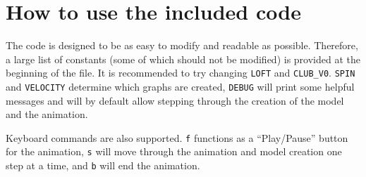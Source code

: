 \documentclass{article}
\begin{document}
\appendix
\section{How to use the included code}
The code is designed to be as easy to modify and readable as possible. Therefore, a large list of constants (some of which should not be modified) is provided at the beginning of the file. It is recommended to try changing \texttt{LOFT} and \texttt{CLUB\_V0}. \texttt{SPIN} and \texttt{VELOCITY} determine which graphs are created, \texttt{DEBUG} will print some helpful messages and will by default allow stepping through the creation of the model and the animation.

Keyboard commands are also supported. \texttt{f} functions as a ``Play/Pause'' button for the animation, \texttt{s} will move through the animation and model creation one step at a time, and \texttt{b} will end the animation.
\end{document}

